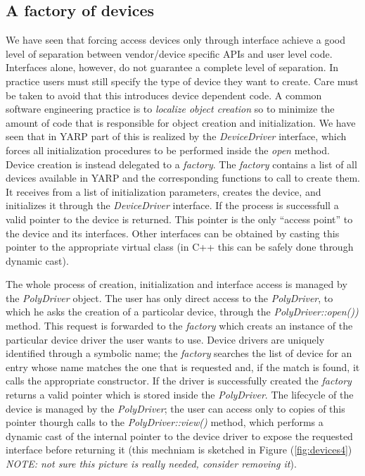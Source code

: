 \subsection{A factory of devices}
We have seen that forcing access devices only through 
interface achieve a good level of separation between vendor/device 
specific APIs and user level code. Interfaces alone, however, do not 
guarantee a complete level of separation. In practice users must still 
specify the type of device they want to create. Care must be taken to 
avoid that this introduces device dependent code. A common software 
engineering practice is to \emph{localize object creation} so to 
minimize the amount of code that is responsible for object creation 
and initialization. 
We have seen that in YARP part of this is realized by the 
\emph{DeviceDriver} interface, which forces all initialization procedures 
to be performed inside the \emph{open} method. Device creation is instead 
delegated to a \emph{factory}. The \emph{factory} contains a list of 
all devices available in YARP and the corresponding functions to call 
to create them. It receives from a list of initialization parameters, 
creates the device, and initializes it 
through the \emph{DeviceDriver} interface. If the process is successfull 
a valid pointer to the device is returned. This pointer is the only 
``access point'' to the device and its interfaces. Other interfaces can 
be obtained by casting this pointer to the appropriate virtual class 
(in C++ this can be safely done through dynamic cast). 

The whole process of creation, initialization and interface access is 
managed by the \emph{PolyDriver} object. The user has only direct access 
to the \emph{PolyDriver}, to which he asks the creation of a particolar 
device, through the \emph{PolyDriver::open())} method. This request is 
forwarded to the \emph{factory} which creats an instance of the particular 
device driver the user wants to use. Device drivers are uniquely identified 
through a symbolic name; the \emph{factory} searches the list of device 
for an entry whose name matches the one that is requested and, if the match 
is found, it calls the appropriate constructor. If the driver is successfully 
created the \emph{factory} returns a valid pointer which is stored inside 
the \emph{PolyDriver}. The lifecycle of the device is managed by the 
\emph{PolyDriver}; the user can access only to copies of this pointer 
thourgh calls to the \emph{PolyDriver::view()} method, which performs 
a dynamic cast of the internal pointer to the device driver to expose 
the requested interface before returning it (this mechniam is sketched 
in Figure (\ref{fig:devices4}) \emph{NOTE: not sure this picture is 
really needed, consider removing it}).

